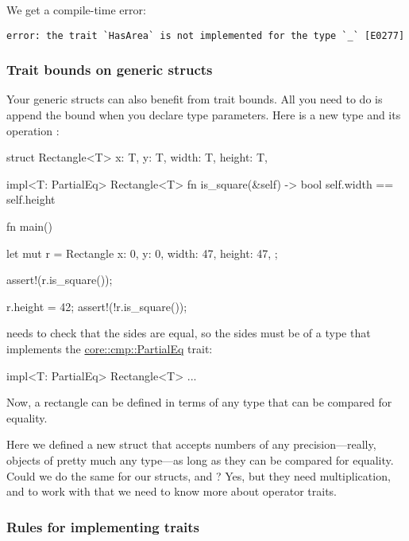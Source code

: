 We get a compile-time error:

\begin{verbatim}
error: the trait `HasArea` is not implemented for the type `_` [E0277]
\end{verbatim}

\subsubsection*{Trait bounds on generic structs}

Your generic structs can also benefit from trait bounds. All you need to do is append the bound when you declare type parameters. Here is a 
new type  and its operation :

\begin{rustc}
struct Rectangle<T> {
    x: T,
    y: T,
    width: T,
    height: T,
}

impl<T: PartialEq> Rectangle<T> {
    fn is_square(&self) -> bool {
        self.width == self.height
    }
}

fn main() {
    let mut r = Rectangle {
        x: 0,
        y: 0,
        width: 47,
        height: 47,
    };

    assert!(r.is_square());

    r.height = 42;
    assert!(!r.is_square());
}
\end{rustc}

 needs to check that the sides are equal, so the sides must be of a type that implements the 
\href{https://doc.rust-lang.org/core/cmp/trait.PartialEq.html}{core::cmp::PartialEq} trait:

\begin{rustc}
impl<T: PartialEq> Rectangle<T> { ... }
\end{rustc}

Now, a rectangle can be defined in terms of any type that can be compared for equality.

\blank

Here we defined a new struct  that accepts numbers of any precision—really, objects of pretty much any type—as long as they 
can be compared for equality. Could we do the same for our  structs,  and ? Yes, but they need
multiplication, and to work with that we need to know more about operator traits.

\subsubsection*{Rules for implementing traits}

